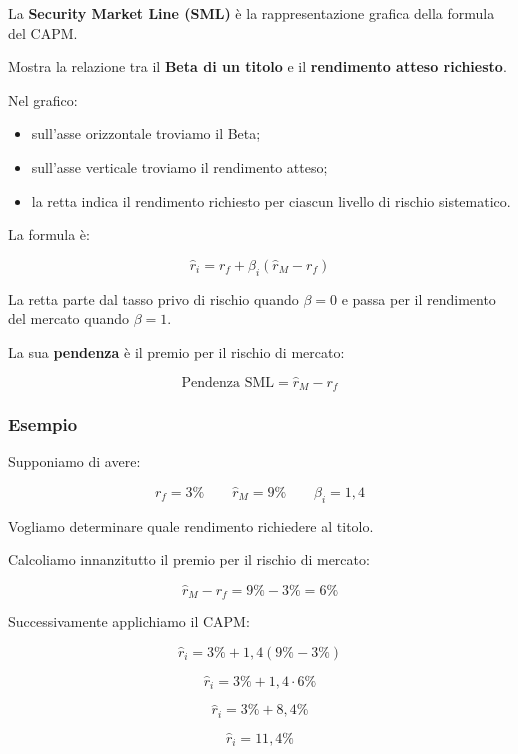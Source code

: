 \noindent La \textbf{Security Market Line (SML)}
è la rappresentazione grafica della formula del CAPM.

\medskip

\noindent Mostra la relazione tra il
\textbf{Beta di un titolo} e il
\textbf{rendimento atteso richiesto}.

\medskip

\noindent Nel grafico:

\begin{itemize}
    \item sull'asse orizzontale troviamo il Beta;
    \item sull'asse verticale troviamo il rendimento atteso;
    \item la retta indica il rendimento richiesto
    per ciascun livello di rischio sistematico.
\end{itemize}

\noindent La formula è:

\[
\boxed{
\hat{r}_i=r_f+\beta_i(\hat{r}_M-r_f)
}
\]

\noindent La retta parte dal tasso privo di rischio
quando $\beta=0$ e passa per il rendimento
del mercato quando $\beta=1$.

\medskip

\noindent La sua \textbf{pendenza} è il premio
per il rischio di mercato:

\[
\boxed{
\text{Pendenza SML}=\hat{r}_M-r_f
}
\]

\subsubsection*{Esempio}

\noindent Supponiamo di avere:

\[
r_f=3\%
\qquad
\hat{r}_M=9\%
\qquad
\beta_i=1{,}4
\]

\noindent Vogliamo determinare quale rendimento
richiedere al titolo.

\medskip

\noindent Calcoliamo innanzitutto il premio
per il rischio di mercato:

\[
\hat{r}_M-r_f=9\%-3\%=\boxed{6\%}
\]

\noindent Successivamente applichiamo il CAPM:

\[
\hat{r}_i=3\%+1{,}4(9\%-3\%)
\]

\[
\hat{r}_i=3\%+1{,}4\cdot6\%
\]

\[
\hat{r}_i=3\%+8{,}4\%
\]

\[
\boxed{\hat{r}_i=11{,}4\%}
\]

